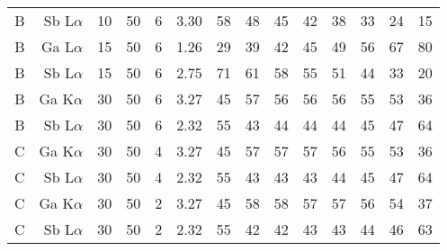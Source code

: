 \begin{table}[phtb]
\begin{center}
\begin{tabular}{rrrrrrrrrrrrrr}
            B            & Sb L$\alpha$  & 10             & 50             & 6           & 3.30              & 58                 & 48           & 45            & 42             & 38             & 33             & 24            & 15             \\
            B            & Ga L$\alpha$  & 15             & 50             & 6           & 1.26              & 29                 & 39           & 42            & 45             & 49             & 56             & 67            & 80             \\
            B            & Sb L$\alpha$  & 15             & 50             & 6           & 2.75              & 71                 & 61           & 58            & 55             & 51             & 44             & 33            & 20             \\
            B            & Ga K$\alpha$  & 30             & 50             & 6           & 3.27              & 45                 & 57           & 56            & 56             & 56             & 55             & 53            & 36             \\
            B            & Sb L$\alpha$  & 30             & 50             & 6           & 2.32              & 55                 & 43           & 44            & 44             & 44             & 45             & 47            & 64             \\
            \hline
            C            & Ga K$\alpha$  & 30             & 50             & 4           & 3.27              & 45                 & 57           & 57            & 57             & 56             & 55             & 53            & 36             \\
            C            & Sb L$\alpha$  & 30             & 50             & 4           & 2.32              & 55                 & 43           & 43            & 43             & 44             & 45             & 47            & 64             \\
            C            & Ga K$\alpha$  & 30             & 50             & 2           & 3.27              & 45                 & 58           & 58            & 57             & 57             & 56             & 54            & 37             \\
            C            & Sb L$\alpha$  & 30             & 50             & 2           & 2.32              & 55                 & 42           & 42            & 43             & 43             & 44             & 46            & 63             \\

\end{tabular}
\end{center}
\end{table}
